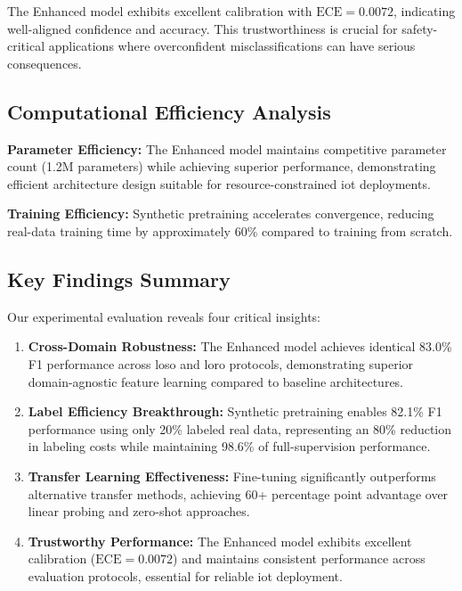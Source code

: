 \documentclass[journal]{IEEEtran}
\begin{document}
The Enhanced model exhibits excellent calibration with $\text{ECE}=0.0072$, indicating well-aligned confidence and accuracy. This trustworthiness is crucial for safety-critical applications where overconfident misclassifications can have serious consequences.

\subsection{Computational Efficiency Analysis}

\textbf{Parameter Efficiency:} The Enhanced model maintains competitive parameter count (1.2M parameters) while achieving superior performance, demonstrating efficient architecture design suitable for resource-constrained \gls{iot} deployments.

\textbf{Training Efficiency:} Synthetic pretraining accelerates convergence, reducing real-data training time by approximately 60\% compared to training from scratch.

\subsection{Key Findings Summary}

Our experimental evaluation reveals four critical insights:

\begin{enumerate}
\item \textbf{Cross-Domain Robustness:} The Enhanced model achieves identical 83.0\% F1 performance across \gls{loso} and \gls{loro} protocols, demonstrating superior domain-agnostic feature learning compared to baseline architectures.

\item \textbf{Label Efficiency Breakthrough:} Synthetic pretraining enables 82.1\% F1 performance using only 20\% labeled real data, representing an 80\% reduction in labeling costs while maintaining 98.6\% of full-supervision performance.

\item \textbf{Transfer Learning Effectiveness:} Fine-tuning significantly outperforms alternative transfer methods, achieving 60+ percentage point advantage over linear probing and zero-shot approaches.

\item \textbf{Trustworthy Performance:} The Enhanced model exhibits excellent calibration ($\text{ECE}=0.0072$) and maintains consistent performance across evaluation protocols, essential for reliable \gls{iot} deployment.
\end{enumerate}
\end{document}
